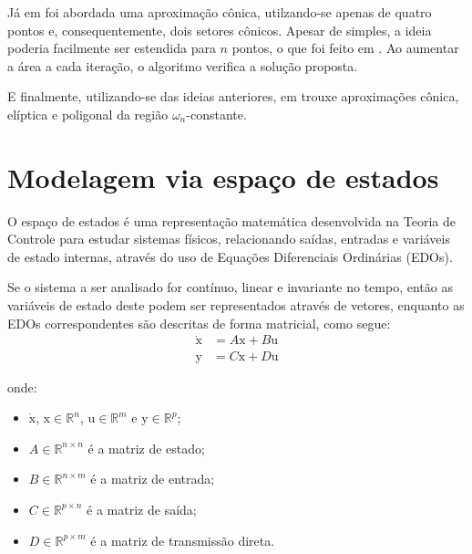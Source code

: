 Já em  foi abordada uma aproximação cônica, utilzando-se apenas de quatro pontos e, consequentemente, dois setores cônicos. Apesar de simples, a ideia poderia facilmente ser estendida para $n$ pontos, o que foi feito em . Ao aumentar a área a cada iteração, o algoritmo verifica a solução proposta.

E finalmente, utilizando-se das ideias anteriores,  em  trouxe aproximações cônica, elíptica e poligonal da região $\omega_n$-constante.

\section{Modelagem via espaço de estados}
O espaço de estados é uma representação matemática desenvolvida na Teoria de Controle para estudar sistemas físicos, relacionando saídas, entradas e variáveis de estado internas, através do uso de Equações Diferenciais Ordinárias (EDOs).

Se o sistema a ser analisado for contínuo, linear e invariante no tempo, então as variáveis de estado deste podem ser representados através de vetores, enquanto as EDOs correspondentes são descritas de forma matricial, como segue:
\begin{subequations}
  \label{eq:SSC}
  \begin{align}
    \dot{\pmb{\mathrm{x}}} &= A\pmb{\mathrm{x}} + B\pmb{\mathrm{u}}\label{eq:SSCEntrada}\\
    \pmb{\mathrm{y}} &= C\pmb{\mathrm{x}} + D\pmb{\mathrm{u}}\label{eq:SSCSaida}
  \end{align}
\end{subequations}

\noindent onde:

\begin{itemize}
  \item $\dot{\pmb{\mathrm{x}}}$, $\pmb{\mathrm{x}} \in \mathbb{R}^n$, $\pmb{\mathrm{u}} \in \mathbb{R}^m$ e $\pmb{\mathrm{y}} \in \mathbb{R}^p$;
  \item $A \in \mathbb{R}^{n \times n}$ é a matriz de estado;
  \item $B \in \mathbb{R}^{n \times m}$ é a matriz de entrada;
  \item $C \in \mathbb{R}^{p \times n}$ é a matriz de saída;
  \item $D \in \mathbb{R}^{p \times m}$ é a matriz de transmissão direta.
\end{itemize}

